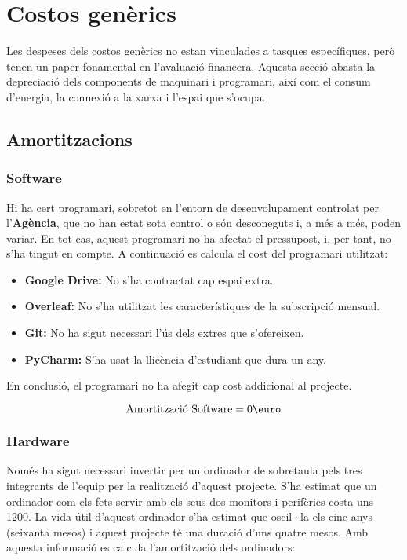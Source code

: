 \section{Costos genèrics}
Les despeses dels costos genèrics no estan vinculades a tasques específiques, però tenen un paper fonamental en l'avaluació financera. Aquesta secció abasta la depreciació dels components de maquinari i programari, així com el consum d'energia, la connexió a la xarxa i l'espai que s'ocupa. 

\subsection{Amortitzacions}
\subsubsection{Software}
Hi ha cert programari, sobretot en l'entorn de desenvolupament controlat per l'\textbf{Agència}, que no han estat sota control o són desconeguts i, a més a més, poden variar. En tot cas, aquest programari no ha afectat el pressupost, i, per tant, no s'ha tingut en compte. A continuació es calcula el cost del programari utilitzat:

\begin{itemize}
    \item \textbf{Google Drive:} No s'ha contractat cap espai extra.
    \item \textbf{Overleaf:} No s'ha utilitzat les característiques de la subscripció mensual.
    \item \textbf{Git:} No ha sigut necessari l'ús dels extres que s'ofereixen.
    \item \textbf{PyCharm:} S'ha usat la llicència d'estudiant que dura un any.
\end{itemize}

En conclusió, el programari no ha afegit cap cost addicional al projecte.

$$
\text{Amortització Software} = 0\text{\euro}
$$

\subsubsection{Hardware}
Només ha sigut necessari invertir per un ordinador de sobretaula pels tres integrants de l'equip per la realització d'aquest projecte. S'ha estimat que un ordinador com els fets servir amb els seus dos monitors i perifèrics costa uns 1200\text{\euro}. La vida útil d'aquest ordinador s'ha estimat que oscil·la els cinc anys (seixanta mesos) i aquest projecte té una duració d'uns quatre mesos. Amb aquesta informació es calcula l'amortització dels ordinadors:

